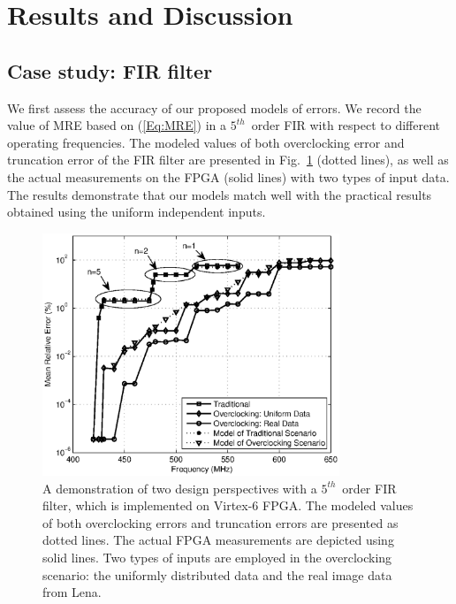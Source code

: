 \documentclass[prodmode,acmtrets]{acmsmall} %
\begin{document}
\section{Results and Discussion}\label{Section_Experiments}
\subsection{Case study: FIR filter}
We first assess the accuracy of our proposed models of errors. We record the value of MRE based on (\ref{Eq:MRE}) in a $5^{th}$~order FIR with respect to different operating frequencies. The modeled values of both overclocking error and truncation error of the FIR filter are presented in Fig.~\ref{Fig:FIR} (dotted lines), as well as the actual measurements on the FPGA (solid lines) with two types of input data. The results demonstrate that our models match well with the practical results obtained using the uniform independent inputs.
\begin{figure}[tbp]
  \centering
  \includegraphics[width=3.5in]{./Figures/Exp/FIR/FIR_Error_New_TCAD.eps}
  \caption{A demonstration of two design perspectives with a $5^{th}$~order FIR filter, which is implemented on Virtex-6 FPGA. The modeled values of both overclocking errors and truncation errors are presented as dotted lines. The actual FPGA measurements are depicted using solid lines. Two types of inputs are employed in the overclocking scenario: the uniformly distributed data and the real image data from Lena.}
  \label{Fig:FIR}
\end{figure}
\end{document}
